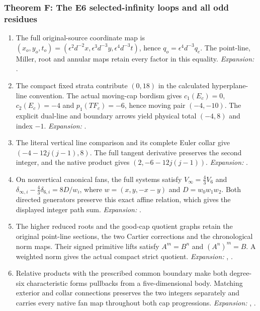 \hypertarget{outline-IV-F}{}
\subsubsection*{Theorem F: The E6 selected-infinity loops and all odd residues}
\begin{enumerate}[label=\arabic*.,leftmargin=*]

\item\hypertarget{step-IV-F-1}{} The full original-source coordinate map is
$(x_o,y_o,t_o)=(\epsilon^2d^{-2}x,\epsilon^3d^{-3}y,
\epsilon^4d^{-3}t)$, hence
$q_o=\epsilon^4d^{-3}q_e$. The point-line, Miller, root and
annular maps retain every factor in this equality.
\textit{Expansion:} .

\item\hypertarget{step-IV-F-2}{} The compact fixed strata contribute $(0,18)$ in the
calculated hyperplane-line convention. The actual moving-cap
bordism gives $c_1(E_c)=0$, $c_2(E_c)=-4$ and
$p_1(TF_c)=-6$, hence moving pair $(-4,-10)$.
The explicit dual-line and boundary arrows yield physical total
$(-4,8)$ and index $-1$.
\textit{Expansion:} .

\item\hypertarget{step-IV-F-3}{} The literal vertical line comparison and its complete
Euler collar give $(-4-12j(j-1),8)$. The full tangent derivative
preserves the second integer, and the native product gives
$(2,-6-12j(j-1))$.
\textit{Expansion:} .

\item\hypertarget{step-IV-F-4}{} On nonvertical canonical fans, the full systems satisfy
$V_\infty=\tfrac43V_6$ and
$\delta_{\infty,i}-\tfrac43\delta_{6,i}=8D/w_i$,
where $w=(x,y,-x-y)$ and $D=w_0w_1w_2$.
Both directed generators preserve this exact affine relation,
which gives the displayed integer path sum.
\textit{Expansion:} .

\item\hypertarget{step-IV-F-5}{} The higher reduced roots and the good-cap quotient graphs
retain the original point-line sections, the two Cartier
corrections and the chronological norm maps. Their signed
primitive lifts satisfy $A^m=B^n$ and $(A^n)^m=B$.
A weighted norm gives the actual compact strict quotient.
\textit{Expansion:} , .

\item\hypertarget{step-IV-F-6}{} Relative products with the prescribed common boundary make
both degree-six characteristic forms pullbacks from a
five-dimensional body. Matching exterior and collar connections
preserves the two integers separately and carries every native
fan map throughout both cap progressions.
\textit{Expansion:} , .


\end{enumerate}
